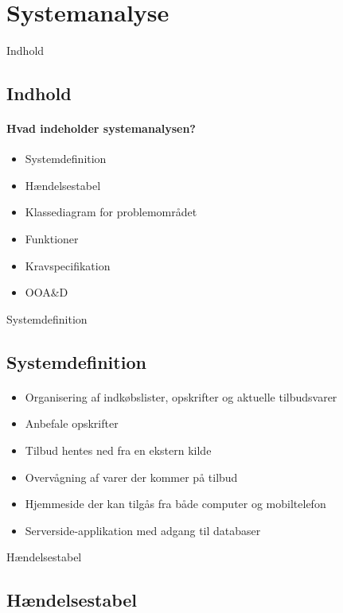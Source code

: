 \section{Systemanalyse}
\begin{frame}{Indhold}
	\subsection{Indhold}
	\framesubtitle{Hvad indeholder systemanalysen?}
	\begin{itemize} 
		\item Systemdefinition
		\item Hændelsestabel
		\item Klassediagram for problemområdet
		\item Funktioner
		\item Kravspecifikation
		\item OOA\&D
		\end{itemize}
\end{frame}

\begin{frame}{Systemdefinition}
	\subsection{Systemdefinition}
	\framesubtitle{}
	\begin{itemize} 
		\item Organisering af indkøbslister, opskrifter og aktuelle tilbudsvarer
		\item Anbefale opskrifter
		\item Tilbud hentes ned fra en ekstern kilde
		\item Overvågning af varer der kommer på tilbud
		\item Hjemmeside der kan tilgås fra både computer og mobiltelefon
		\item Serverside-applikation med adgang til databaser
	\end{itemize}
\end{frame}

\begin{frame}{Hændelsestabel}
\subsection{Hændelsestabel}
	\framesubtitle{}
	
\end{frame}

